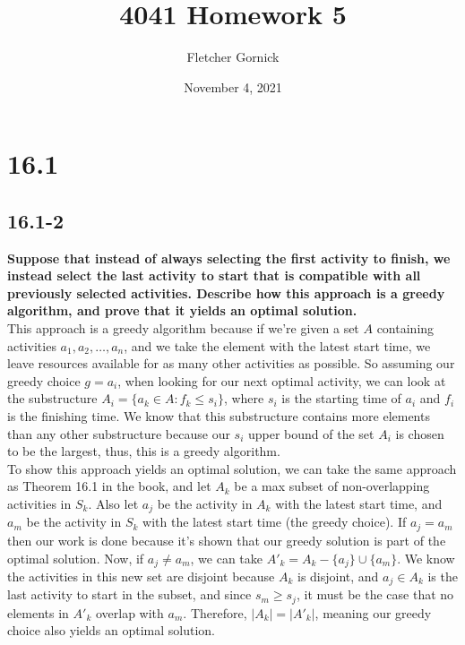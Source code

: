 \documentclass[11pt]{article}
\title{4041 Homework 5}
\author{Fletcher Gornick}
\date{November 4, 2021}
\begin{document}
 \maketitle 

 \section*{16.1}
 \subsection*{16.1-2}
 \textbf{Suppose that instead of always selecting the first activity to finish, we instead 
 select the last activity to start that is compatible with all previously selected activities. 
 Describe how this approach is a greedy algorithm, and prove that it yields an optimal 
 solution.} \\

 This approach is a greedy algorithm because if we're given a set $A$ containing activities 
 $a_1,a_2,\dots,a_n$, and we take the element with the latest start time, we leave resources 
 available for as many other activities as possible.  So assuming our greedy choice $g=a_i$, 
 when looking for our next optimal activity, we can look at the substructure 
 $A_i = \{a_k \in A: f_k \leq s_i\}$, where $s_i$ is the starting time of $a_i$ and $f_i$ is 
 the finishing time.  We know that this substructure contains more elements than any other 
 substructure because our $s_i$ upper bound of the set $A_i$ is chosen to be the largest, 
 thus, this is a greedy algorithm. \\

 To show this approach yields an optimal solution, we can take the same approach as Theorem 
 16.1 in the book, and let $A_k$ be a max subset of non-overlapping activities in $S_k$.  Also 
 let $a_j$ be the activity in $A_k$ with the latest start time, and $a_m$ be the activity in 
 $S_k$ with the latest start time (the greedy choice). If $a_j = a_m$ then our work is done 
 because it's shown that our greedy solution is part of the optimal solution. Now, if 
 $a_j \not= a_m$, we can take $A'_k = A_k - \{a_j\} \cup \{a_m\}$. We know the activities in 
 this new set are disjoint because $A_k$ is disjoint, and $a_j \in A_k$ is the last activity 
 to start in the subset, and since $s_m \geq s_j$, it must be the case that no elements in 
 $A'_k$ overlap with $a_m$. Therefore, $|A_k| = |A'_k|$, meaning our greedy choice also yields 
 an optimal solution.
\end{document}
